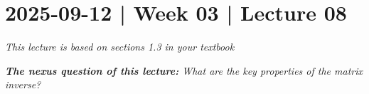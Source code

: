 \documentclass[10pt]{article}
\theoremstyle{definition}
\begin{document}

  

    


      

    


\newpage
\section{2025-09-12 | Week 03 | Lecture 08}
\textit{This lecture is based on sections 1.3 in your textbook}



\begin{center}
  \begin{tcolorbox}[width=0.9\textwidth, colback=white, colframe=black]
    \textit{\textbf{The nexus question of this lecture:} What are the key
      properties of the matrix inverse?}
  \end{tcolorbox}
\end{center}
\end{document}
